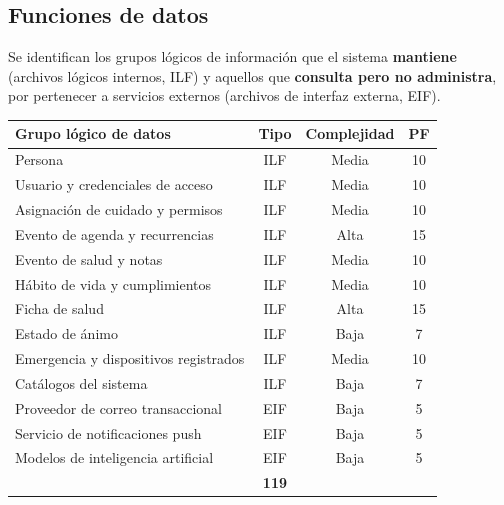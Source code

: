 \documentclass[a4paper,12pt]{article}
\begin{document}
    \subsection{Funciones de datos}
    \par Se identifican los grupos lógicos de información que el sistema \textbf{mantiene} (archivos lógicos internos, ILF) y aquellos que \textbf{consulta pero no administra}, por pertenecer a servicios externos (archivos de interfaz externa, EIF).
    \begin{center}
        \begin{tabular}{ |p{6.5cm}|c|c|c| }
            \hline
            \rowcolor{lightgray} \textbf{Grupo lógico de datos} & \textbf{Tipo} & \textbf{Complejidad} & \textbf{PF} \\
            \hline
            Persona & ILF & Media & 10 \\
            \hline
            Usuario y credenciales de acceso & ILF & Media & 10 \\
            \hline
            Asignación de cuidado y permisos & ILF & Media & 10 \\
            \hline
            Evento de agenda y recurrencias & ILF & Alta & 15 \\
            \hline
            Evento de salud y notas & ILF & Media & 10 \\
            \hline
            Hábito de vida y cumplimientos & ILF & Media & 10 \\
            \hline
            Ficha de salud & ILF & Alta & 15 \\
            \hline
            Estado de ánimo & ILF & Baja & 7 \\
            \hline
            Emergencia y dispositivos registrados & ILF & Media & 10 \\
            \hline
            Catálogos del sistema & ILF & Baja & 7 \\
            \hline
            Proveedor de correo transaccional & EIF & Baja & 5 \\
            \hline
            Servicio de notificaciones push & EIF & Baja & 5 \\
            \hline
            Modelos de inteligencia artificial & EIF & Baja & 5 \\
            \hline
            \rowcolor{lightgray} \multicolumn{3}{ |r| }{\textbf{Subtotal funciones de datos}} & \textbf{119} \\
            \hline
        \end{tabular}
    \end{center}
\end{document}

